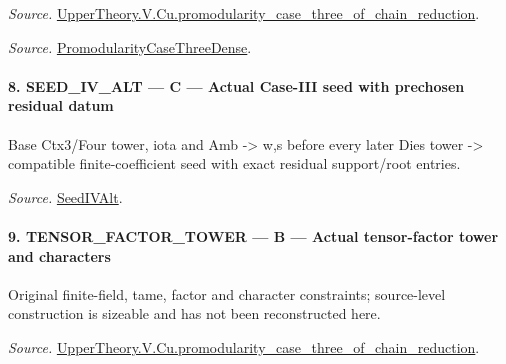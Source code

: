 \emph{Source.} \href{https://github.com/CocoSgt/riemann-hypothesis-lean/blob/7cbf7a0c32fca1badf05931879a37c3f8a2b03b4/src/Development/AutomorphicArithmetic/AutomorphicVarieties/ModularityArgument/ThresholdArguments/DenseThresholdCases/PromodularityCaseThreeOfLemmas.lean#L131-L153}{UpperTheory.V.Cu.promodularity\_\allowbreak case\_\allowbreak three\_\allowbreak of\_\allowbreak chain\_\allowbreak reduction}.

\emph{Source.} \href{https://github.com/CocoSgt/riemann-hypothesis-lean/blob/7cbf7a0c32fca1badf05931879a37c3f8a2b03b4/src/Development/AutomorphicArithmetic/AutomorphicVarieties/ModularityArgument/ThresholdArguments/DenseThresholdCases/PromodularityCaseThree.lean#L40-L42}{PromodularityCaseThreeDense}.



\paragraph{8. SEED\_\allowbreak IV\_\allowbreak ALT — C — Actual Case-III seed with prechosen residual datum}

Base Ctx3/Four tower, iota and Amb -> w,s before every later Dies tower -> compatible finite-coefficient seed with exact residual support/root entries.

\emph{Source.} \href{https://github.com/CocoSgt/riemann-hypothesis-lean/blob/7cbf7a0c32fca1badf05931879a37c3f8a2b03b4/src/Development/AutomorphicArithmetic/AutomorphicVarieties/ModularityArgument/ThresholdArguments/DenseThresholdCases/PromodularityCaseThree.lean#L19-L25}{SeedIVAlt}.



\paragraph{9. TENSOR\_\allowbreak FACTOR\_\allowbreak TOWER — B — Actual tensor-factor tower and characters}

Original finite-field, tame, factor and character constraints; source-level construction is sizeable and has not been reconstructed here.

\emph{Source.} \href{https://github.com/CocoSgt/riemann-hypothesis-lean/blob/7cbf7a0c32fca1badf05931879a37c3f8a2b03b4/src/Development/AutomorphicArithmetic/AutomorphicVarieties/ModularityArgument/ThresholdArguments/DenseThresholdCases/PromodularityCaseThreeOfLemmas.lean#L131-L153}{UpperTheory.V.Cu.promodularity\_\allowbreak case\_\allowbreak three\_\allowbreak of\_\allowbreak chain\_\allowbreak reduction}.



